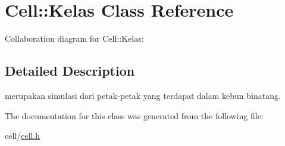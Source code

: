 \hypertarget{classCell_1_1Kelas}{}\section{Cell\+:\+:Kelas Class Reference}
\label{classCell_1_1Kelas}


Collaboration diagram for Cell\+:\+:Kelas\+:


\subsection{Detailed Description}
merupakan simulasi dari petak-\/petak yang terdapat dalam kebun binatang. 

The documentation for this class was generated from the following file\+:\begin{DoxyCompactItemize}
\item 
cell/\hyperlink{cell_8h}{cell.\+h}\end{DoxyCompactItemize}
